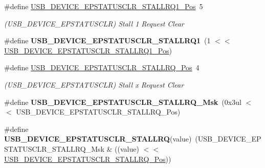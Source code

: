 \begin{DoxyCompactItemize}
\item 
\hypertarget{group___s_a_m_l21___u_s_b_gaa0343d3270989b59a90ec0ea384d39ec}{}\#define \hyperlink{group___s_a_m_l21___u_s_b_gaa0343d3270989b59a90ec0ea384d39ec}{U\+S\+B\+\_\+\+D\+E\+V\+I\+C\+E\+\_\+\+E\+P\+S\+T\+A\+T\+U\+S\+C\+L\+R\+\_\+\+S\+T\+A\+L\+L\+R\+Q1\+\_\+\+Pos}~5\label{group___s_a_m_l21___u_s_b_gaa0343d3270989b59a90ec0ea384d39ec}

\begin{DoxyCompactList}\small\item\em (U\+S\+B\+\_\+\+D\+E\+V\+I\+C\+E\+\_\+\+E\+P\+S\+T\+A\+T\+U\+S\+C\+L\+R) Stall 1 Request Clear \end{DoxyCompactList}\item 
\hypertarget{group___s_a_m_l21___u_s_b_ga51f4a9e1fc3ab27ba3d863c7c19e880f}{}\#define {\bfseries U\+S\+B\+\_\+\+D\+E\+V\+I\+C\+E\+\_\+\+E\+P\+S\+T\+A\+T\+U\+S\+C\+L\+R\+\_\+\+S\+T\+A\+L\+L\+R\+Q1}~(1 $<$$<$ \hyperlink{group___s_a_m_l21___u_s_b_gaa0343d3270989b59a90ec0ea384d39ec}{U\+S\+B\+\_\+\+D\+E\+V\+I\+C\+E\+\_\+\+E\+P\+S\+T\+A\+T\+U\+S\+C\+L\+R\+\_\+\+S\+T\+A\+L\+L\+R\+Q1\+\_\+\+Pos})\label{group___s_a_m_l21___u_s_b_ga51f4a9e1fc3ab27ba3d863c7c19e880f}

\item 
\hypertarget{group___s_a_m_l21___u_s_b_gad8738afba20ecebd5e8ba70d93dd7c8f}{}\#define \hyperlink{group___s_a_m_l21___u_s_b_gad8738afba20ecebd5e8ba70d93dd7c8f}{U\+S\+B\+\_\+\+D\+E\+V\+I\+C\+E\+\_\+\+E\+P\+S\+T\+A\+T\+U\+S\+C\+L\+R\+\_\+\+S\+T\+A\+L\+L\+R\+Q\+\_\+\+Pos}~4\label{group___s_a_m_l21___u_s_b_gad8738afba20ecebd5e8ba70d93dd7c8f}

\begin{DoxyCompactList}\small\item\em (U\+S\+B\+\_\+\+D\+E\+V\+I\+C\+E\+\_\+\+E\+P\+S\+T\+A\+T\+U\+S\+C\+L\+R) Stall x Request Clear \end{DoxyCompactList}\item 
\hypertarget{group___s_a_m_l21___u_s_b_gae652cabacbccfdc5d996c958e4aa93e3}{}\#define {\bfseries U\+S\+B\+\_\+\+D\+E\+V\+I\+C\+E\+\_\+\+E\+P\+S\+T\+A\+T\+U\+S\+C\+L\+R\+\_\+\+S\+T\+A\+L\+L\+R\+Q\+\_\+\+Msk}~(0x3ul $<$$<$ U\+S\+B\+\_\+\+D\+E\+V\+I\+C\+E\+\_\+\+E\+P\+S\+T\+A\+T\+U\+S\+C\+L\+R\+\_\+\+S\+T\+A\+L\+L\+R\+Q\+\_\+\+Pos)\label{group___s_a_m_l21___u_s_b_gae652cabacbccfdc5d996c958e4aa93e3}

\item 
\hypertarget{group___s_a_m_l21___u_s_b_ga610c562599ad3e86cb38770888e6195b}{}\#define {\bfseries U\+S\+B\+\_\+\+D\+E\+V\+I\+C\+E\+\_\+\+E\+P\+S\+T\+A\+T\+U\+S\+C\+L\+R\+\_\+\+S\+T\+A\+L\+L\+R\+Q}(value)~(U\+S\+B\+\_\+\+D\+E\+V\+I\+C\+E\+\_\+\+E\+P\+S\+T\+A\+T\+U\+S\+C\+L\+R\+\_\+\+S\+T\+A\+L\+L\+R\+Q\+\_\+\+Msk \& ((value) $<$$<$ \hyperlink{group___s_a_m_l21___u_s_b_gad8738afba20ecebd5e8ba70d93dd7c8f}{U\+S\+B\+\_\+\+D\+E\+V\+I\+C\+E\+\_\+\+E\+P\+S\+T\+A\+T\+U\+S\+C\+L\+R\+\_\+\+S\+T\+A\+L\+L\+R\+Q\+\_\+\+Pos}))\label{group___s_a_m_l21___u_s_b_ga610c562599ad3e86cb38770888e6195b}


\end{DoxyCompactItemize}
